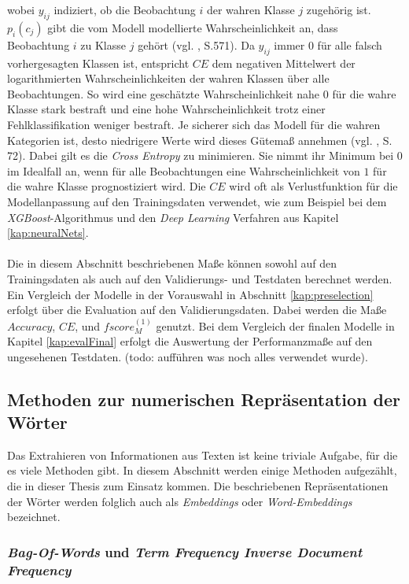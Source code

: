 \documentclass[a4paper,11pt]{article}
\begin{document}
wobei $y_{ij}$ indiziert, ob die Beobachtung $i$ der wahren Klasse $j$ zugehörig ist. $p_i(c_j)$ gibt die vom Modell modellierte Wahrscheinlichkeit an, dass Beobachtung $i$ zu Klasse $j$ gehört (vgl. \cite{murphy}, S.571). Da $y_{ij}$ immer $0$ für alle falsch vorhergesagten Klassen ist, entspricht $CE$ dem negativen Mittelwert der logarithmierten Wahrscheinlichkeiten der wahren Klassen über alle Beobachtungen. So wird eine geschätzte Wahrscheinlichkeit nahe $0$ für die wahre Klasse stark bestraft und eine hohe Wahrscheinlichkeit trotz einer Fehlklassifikation weniger bestraft. Je sicherer sich das Modell für die wahren Kategorien ist, desto niedrigere Werte wird dieses Gütemaß annehmen (vgl. \cite{proMachine}, S. 72). 
Dabei gilt es die \textit{Cross Entropy} zu minimieren. Sie nimmt ihr Minimum bei $0$ im Idealfall an, wenn für alle Beobachtungen eine Wahrscheinlichkeit von $1$ für die wahre Klasse prognostiziert wird. Die $CE$ wird oft als Verlustfunktion für die Modellanpassung auf den Trainingsdaten verwendet, wie zum Beispiel bei dem \textit{XGBoost}-Algorithmus und den \textit{Deep Learning} Verfahren aus Kapitel \ref{kap:neuralNets}.\\
\\
Die in diesem Abschnitt beschriebenen Maße können sowohl auf den Trainingsdaten als auch auf den  Validierungs- und Testdaten berechnet werden. Ein Vergleich der Modelle in der Vorauswahl in Abschnitt \ref{kap:preselection} erfolgt über die Evaluation auf den Validierungsdaten. Dabei werden die Maße $Accuracy$, $CE$, und $fscore_M^{(1)}$ genutzt.
Bei dem Vergleich der finalen Modelle in Kapitel \ref{kap:evalFinal} erfolgt die Auswertung der Performanzmaße auf den ungesehenen Testdaten. (todo: aufführen was noch alles verwendet wurde).


\subsection{Methoden zur numerischen Repräsentation der Wörter} \label{kap:3.1Wordemb}

Das Extrahieren von Informationen aus Texten ist keine triviale Aufgabe, für die es viele Methoden gibt. In diesem Abschnitt werden einige Methoden aufgezählt, die in dieser Thesis zum Einsatz kommen.
Die beschriebenen Repräsentationen der Wörter werden folglich auch als \textit{Embeddings} oder \textit{Word-Embeddings} bezeichnet.


\subsubsection{\textit{Bag-Of-Words} und \textit{Term Frequency Inverse Document Frequency}} \label{Kap:Tfidf}
\end{document}
